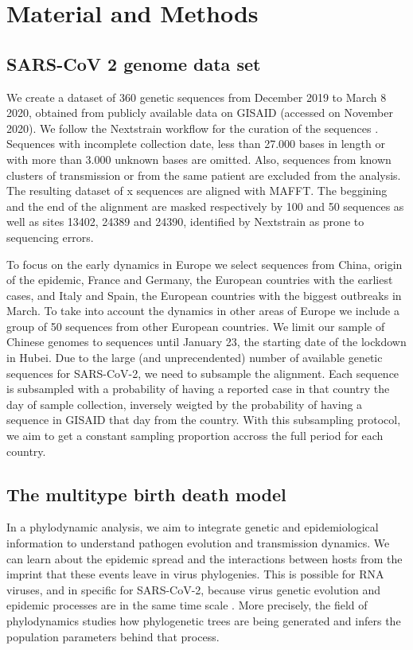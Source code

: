 \chapter{Material and Methods}

\section{SARS-CoV 2 genome data set}

We create a dataset of 360 genetic sequences from December 2019 to March 8 2020, obtained from publicly available data on GISAID \cite{GISAID} (accessed on November 2020). We follow the Nextstrain workflow for the curation of the sequences \cite{nextstrain}. Sequences with incomplete collection date, less than 27.000 bases in length or with more than 3.000 unknown bases are omitted. Also, sequences from known clusters of transmission or from the same patient are excluded from the analysis. The resulting dataset of x sequences are aligned with MAFFT. The beggining and the end of the alignment are masked respectively by 100 and 50 sequences as well as sites  13402, 24389 and 24390, identified by Nextstrain as prone to sequencing errors.

To focus on the early dynamics in Europe we select sequences from China, origin of the epidemic, France and Germany, the European countries with the earliest cases, and Italy and Spain, the European countries with the biggest outbreaks in March. To take into account the dynamics in other areas of Europe we include a group of 50 sequences from other European countries. We limit our sample of Chinese genomes to sequences until January 23, the starting date of the lockdown in Hubei. Due to the large (and unprecendented) number of available genetic sequences for SARS-CoV-2, we need to subsample the alignment. Each sequence is subsampled with a probability of having a reported case in that country the day of sample collection, inversely weigted by the probability of having a sequence in GISAID that day from the country. With this subsampling protocol, we aim to get a constant sampling proportion accross the full period for each country. 

\section{The multitype birth death model}


In a phylodynamic analysis, we aim to integrate genetic and epidemiological information to understand pathogen evolution and transmission dynamics. We can learn about the epidemic spread and the interactions between hosts from the imprint that these events leave in virus phylogenies. This is possible for RNA viruses, and in specific for SARS-CoV-2, because virus genetic evolution and epidemic processes are in the same time scale \cite{Grenfell2013} \cite{Volz2014}.  More precisely, the field of phylodynamics studies how phylogenetic trees are being generated and infers the population parameters behind that process. 



